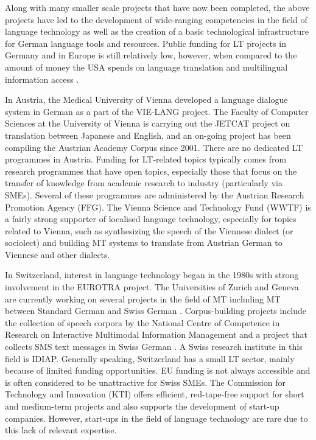 \documentclass[]{../../metanetpaper}
\begin{document}
\begin{multicols}{2}
    Along with many smaller scale projects that have now been completed, the above projects have led to the development of wide-ranging competencies in the field of language technology as well as the creation of a basic technological infrastructure for German language tools and resources. Public funding for LT projects in Germany and in Europe is still relatively low, however, when compared to the amount of money the USA spends on language translation and multilingual information access \cite{laz1}. 

    In Austria, the Medical University of Vienna developed a language dialogue system in German as a part of the VIE-LANG project. The Faculty of Computer Sciences at the University of Vienna is carrying out the JETCAT project on translation between Japanese and English, and an on-going project has been compiling the Austrian Academy Corpus since 2001. There are no dedicated LT programmes in Austria. Funding for LT-related topics typically comes from research programmes that have open topics, especially those that focus on the transfer of knowledge from academic research to industry (particularly via SMEs). Several of these programmes are administered by the Austrian Research Promotion Agency (FFG). The Vienna Science and Technology Fund (WWTF) is a fairly strong supporter of localised language technology, especially for topics related to Vienna, such as synthesizing the speech of the Viennese dialect (or sociolect) and building MT systems to translate from Austrian German to Viennese and other dialects. 

    In Switzerland, interest in language technology began in the 1980s with strong involvement in the EUROTRA project. The Universities of Zurich and Geneva are currently working on several projects in the field of MT including MT between Standard German and Swiss German \cite{latl1}. Corpus-building projects include the collection of speech corpora by the National Centre of Competence in Research on Interactive Multimodal Information Management and a project that collects SMS text messages in Swiss German \cite{sor1}. A Swiss research institute in this field is IDIAP. Generally speaking, Switzerland has a small LT sector, mainly because of limited funding opportunities. EU funding is not always accessible and is often considered to be unattractive for Swiss SMEs. The Commission for Technology and Innovation (KTI) offers efficient, red-tape-free support for short and medium-term projects and also supports the development of start-up companies. However, start-ups in the field of language technology are rare due to this lack of relevant expertise.


\end{multicols}
\end{document}
